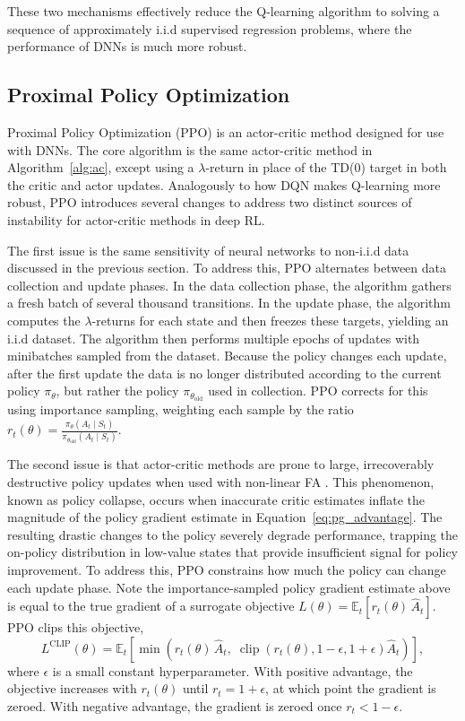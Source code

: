   These two mechanisms effectively reduce the Q-learning algorithm to solving a sequence of approximately i.i.d supervised regression problems, where the performance of DNNs is much more robust. 
  
  \subsection{Proximal Policy Optimization}
  Proximal Policy Optimization (PPO)  is an actor-critic method designed for use with DNNs. The core algorithm is the same actor-critic method in Algorithm~\ref{alg:ac}, except using a $\lambda$-return in place of the TD(0) target in both the critic and actor updates. Analogously to how DQN makes Q-learning more robust, PPO introduces several changes to address two distinct sources of instability for actor-critic methods in deep RL.
  
  The first issue is the same sensitivity of neural networks to non-i.i.d data discussed in the previous section. To address this, PPO alternates between data collection and update phases. In the data collection phase, the algorithm gathers a fresh batch of several thousand transitions. In the update phase, the algorithm computes the $\lambda$-returns for each state and then freezes these targets, yielding an i.i.d dataset. The algorithm then performs multiple epochs of updates with minibatches sampled from the dataset. Because the policy changes each update, after the first update the data is no longer distributed according to the current policy $\pi_\theta$, but rather the policy $\pi_{\theta_{\text{old}}}$ used in collection. PPO corrects for this using importance sampling, weighting each sample by the ratio $r_t(\theta) = \frac{\pi_\theta(A_t \mid S_t)}{\pi_{\theta_{\text{old}}}(A_t \mid S_t)}$.
  
  The second issue is that actor-critic methods are prone to large, irrecoverably destructive policy updates when used with non-linear FA . This phenomenon, known as policy collapse, occurs when inaccurate critic estimates inflate the magnitude of the policy gradient estimate in Equation~\eqref{eq:pg_advantage}. The resulting drastic changes to the policy severely degrade performance, trapping the on-policy distribution in low-value states that provide insufficient signal for policy improvement. To address this, PPO constrains how much the policy can change each update phase. Note the importance-sampled policy gradient estimate above is equal to the true gradient of a surrogate objective $L(\theta) = \mathbb{E}_t\!\left[ r_t(\theta)\, \hat{A}_t \right]$. PPO clips this objective,
  \begin{equation}
  L^{\text{CLIP}}(\theta) = \mathbb{E}_t\!\left[ \min\!\left( r_t(\theta)\,\hat{A}_t,\; \operatorname{clip}\!\left(r_t(\theta), 1-\epsilon, 1+\epsilon\right)\hat{A}_t \right) \right],
  \end{equation}
  where $\epsilon$ is a small constant hyperparameter. With positive advantage, the objective increases with $r_t(\theta)$ until $r_t = 1+\epsilon$, at which point the gradient is zeroed. With negative advantage, the gradient is zeroed once $r_t < 1-\epsilon$.
  
